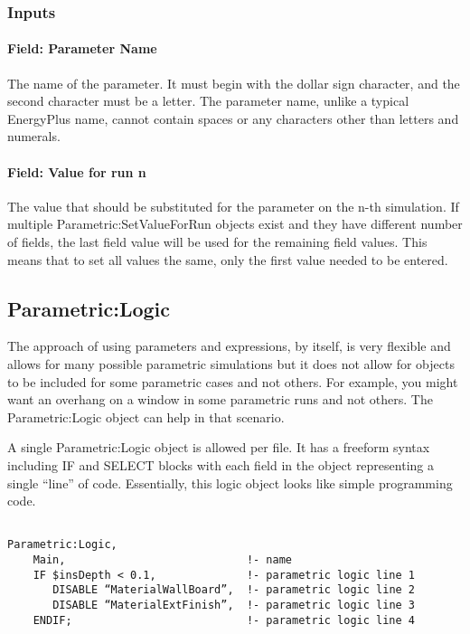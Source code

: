 \subsubsection{Inputs}\label{inputs-030}

\paragraph{Field: Parameter Name}\label{field-parameter-name}

The name of the parameter. It must begin with the dollar sign character, and the second character must be a letter. The parameter name, unlike a typical EnergyPlus name, cannot contain spaces or any characters other than letters and numerals.

\paragraph{Field: Value for run n}\label{field-value-for-run-n}

The value that should be substituted for the parameter on the n-th simulation. If multiple Parametric:SetValueForRun objects exist and they have different number of fields, the last field value will be used for the remaining field values. This means that to set all values the same, only the first value needed to be entered.

\subsection{Parametric:Logic}\label{parametriclogic}

The approach of using parameters and expressions, by itself, is very flexible and allows for many possible parametric simulations but it does not allow for objects to be included for some parametric cases and not others. For example, you might want an overhang on a window in some parametric runs and not others. The Parametric:Logic object can help in that scenario.

A single Parametric:Logic object is allowed per file. It has a freeform syntax including IF and SELECT blocks with each field in the object representing a single ``line'' of code. Essentially, this logic object looks like simple programming code.

\begin{lstlisting}

Parametric:Logic,
    Main,                            !- name
    IF $insDepth < 0.1,              !- parametric logic line 1
       DISABLE “MaterialWallBoard”,  !- parametric logic line 2
       DISABLE “MaterialExtFinish”,  !- parametric logic line 3
    ENDIF;                           !- parametric logic line 4
\end{lstlisting}


